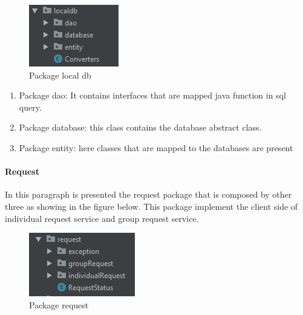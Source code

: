 \begin{figure}[H]
\includegraphics[width=\linewidth]{images/LocalDB.png}
\caption{ Package local db}
\label{fig:pkgsharedata}
\end{figure}

\begin{enumerate}
\item Package dao: It contains interfaces that are mapped java function in sql query.
\item Package database: this class contains the database abstract class.
\item Package entity: here classes that are mapped to the databases are present 
\end{enumerate}

\paragraph{Request}
In this paragraph is presented the request package that is composed by other three as showing in the figure below. This package implement the client side of individual request service and group request service.

\begin{figure}[H]
\includegraphics[width=\linewidth]{images/Request.png}
\caption{ Package request }
\label{fig:pkgsharedata}
\end{figure}

